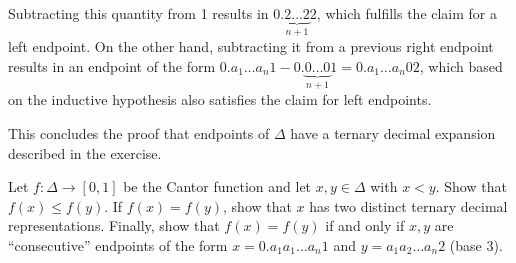 \begin{solution}
\begin{itemize}
        Subtracting this quantity from 1 results in $0.\underbrace{2 \ldots 2}_{n + 1} 2$, which fulfills the claim for a left endpoint.
        On the other hand, subtracting it from a previous right endpoint results in an endpoint of the form $0.a_1 \ldots a_n 1 - 0.\underbrace{0 \ldots 0}_{n + 1} 1 = 0.a_1 \ldots a_n 0 2$, which based on the inductive hypothesis also satisfies the claim for left endpoints.
    \end{itemize}
    This concludes the proof that endpoints of $\Delta$ have a ternary decimal expansion described in the exercise.
\end{solution}

\begin{exercise}{26}
    Let $f: \Delta \rightarrow [0,1]$ be the Cantor function and let $x, y \in \Delta$ with $x < y$.
    Show that $f(x) \leq f(y)$.
    If $f(x) = f(y)$, show that $x$ has two distinct ternary decimal representations.
    Finally, show that $f(x) = f(y)$ if and only if $x, y$ are ``consecutive'' endpoints of the form $x = 0.a_1 a_1 \ldots a_{n} 1$ and $y = a_1 a_2 \ldots a_n 2$ (base 3).
\end{exercise}

